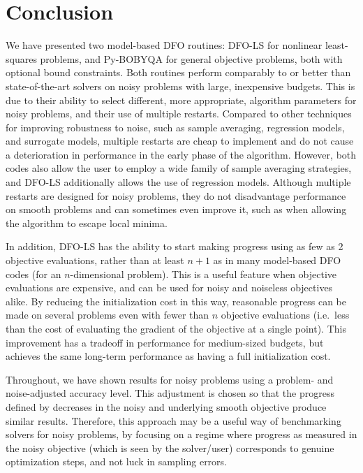 \section{Conclusion} \label{sec_conclusion}
We have presented two model-based DFO routines: DFO-LS for nonlinear least-squares problems, and Py-BOBYQA for general objective problems, both with optional bound constraints.
Both routines perform comparably to or better than state-of-the-art solvers on noisy problems with large, inexpensive budgets.
This is due to their ability to select different, more appropriate, algorithm parameters for noisy problems, and their use of multiple restarts.
Compared to other techniques for improving robustness to noise, such as sample averaging, regression models, and surrogate models, multiple restarts are cheap to implement and do not cause a deterioration in performance in the early phase of the algorithm.
However, both codes also allow the user to employ a wide family of sample averaging strategies, and DFO-LS additionally allows the use of regression models.
Although multiple restarts are designed for noisy problems, they do not disadvantage performance on smooth problems and can sometimes even improve it, such as when allowing the algorithm to escape local minima.

In addition, DFO-LS has the ability to start making progress using as few as 2 objective evaluations, rather than at least $n+1$ as in many model-based DFO codes (for an $n$-dimensional problem). 
This is a useful feature when objective evaluations are expensive, and can be used for noisy and noiseless objectives alike.
By reducing the initialization cost in this way, reasonable progress can be made on several problems even with fewer than $n$ objective evaluations (i.e.~less than the cost of evaluating the gradient of the objective at a single point).
This improvement has a tradeoff in performance for medium-sized budgets, but achieves the same long-term performance as having a full initialization cost.

Throughout, we have shown results for noisy problems using a problem- and noise-adjusted accuracy level.
This adjustment is chosen so that the progress defined by decreases in the noisy and underlying smooth objective produce similar results.
Therefore, this approach may be a useful way of benchmarking solvers for noisy problems, by focusing on a regime where progress as measured in the noisy objective (which is seen by the solver/user) corresponds to genuine optimization steps, and not luck in sampling errors.

